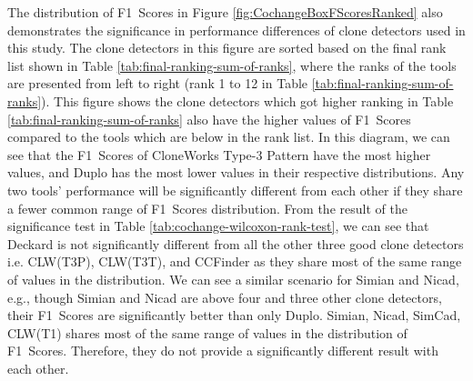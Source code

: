 \documentclass[review]{elsarticle}
\begin{document}
The distribution of F1~Scores in Figure \ref{fig:CochangeBoxFScoresRanked} also demonstrates the significance in performance differences of clone detectors used in this study. The clone detectors in this figure are sorted based on the final rank list shown in Table \ref{tab:final-ranking-sum-of-ranks}, where the ranks of the tools are presented from left to right (rank 1 to 12 in Table \ref{tab:final-ranking-sum-of-ranks}). This figure shows the clone detectors which got higher ranking in Table \ref{tab:final-ranking-sum-of-ranks} also have the higher values of F1~Scores compared to the tools which are below in the rank list. In this diagram, we can see that the F1~Scores of CloneWorks Type-3 Pattern have the most higher values, and Duplo has the most lower values in their respective distributions. Any two tools' performance will be significantly different from each other if they share a fewer common range of F1~Scores distribution. From the result of the significance test in Table \ref{tab:cochange-wilcoxon-rank-test}, we can see that Deckard is not significantly different from all the other three good clone detectors i.e. CLW(T3P), CLW(T3T), and CCFinder as they share most of the same range of values in the distribution. We can see a similar scenario for Simian and Nicad, e.g., though Simian and Nicad are above four and three other clone detectors, their F1~Scores are significantly better than only Duplo. Simian, Nicad, SimCad, CLW(T1) shares most of the same range of values in the distribution of F1~Scores. Therefore, they do not provide a significantly different result with each other. 
\end{document}
